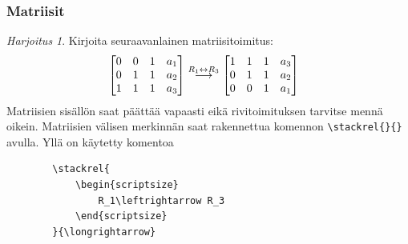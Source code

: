 \documentclass[handout,hyperref={colorlinks=true}]{beamer}
\theoremstyle{remark}
\newtheorem{harj}{Harjoitus}[section]
\begin{document}
\begin{frame}[fragile]
    \frametitle{Matriisit}
    \begin{harj}
        Kirjoita seuraavanlainen matriisitoimitus: 
        \begin{align*}
            &
            \begin{bmatrix*}[r]
                0 & 0 & 1 & a_1\\
                0 & 1 & 1 & a_2\\
                1 & 1 & 1 & a_3
            \end{bmatrix*}
        \stackrel{\begin{scriptsize} R_1\leftrightarrow R_3 \end{scriptsize} }{\longrightarrow}
            \begin{bmatrix*}[r]
                1 & 1 & 1 & a_3\\
                0 & 1 & 1 & a_2\\
                0 & 0 & 1 & a_1
            \end{bmatrix*}
        \end{align*}
        Matriisien sisällön saat päättää vapaasti eikä rivitoimituksen tarvitse mennä oikein. Matriisien välisen merkinnän saat rakennettua komennon \verb-\stackrel{}{}- avulla. Yllä on käytetty komentoa
        \begin{verbatim}
        \stackrel{
            \begin{scriptsize} 
                R_1\leftrightarrow R_3 
            \end{scriptsize}
        }{\longrightarrow} 
        \end{verbatim}

    \end{harj}
\end{frame}
\end{document}
